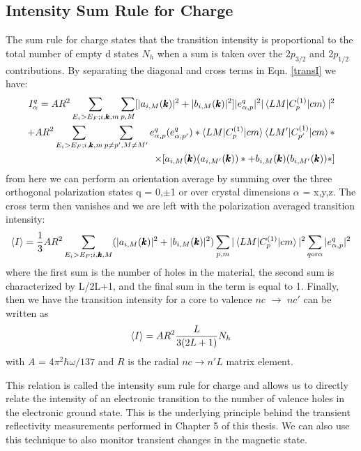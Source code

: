 \subsection{Intensity Sum Rule for Charge}

The sum rule for charge states that the transition intensity is proportional to the total number of empty d states $N_h$ when a sum is taken over the 2$p_{3/2}$ and 2$p_{1/2}$ contributions. By separating the diagonal and cross terms in Eqn. \ref{transI} we have:
\begin{align}
I_{\alpha}^q=AR^2\sum_{E_i>E_F; i ,\pmb{k}, m}\sum_{p,M}[|a_{i,M}(\pmb{k})|^2+|b_{i,M}(\pmb{k})|^2]|e_{\alpha,p}^q|^2|\braket{LM|C_p^{(1)}|cm}|^2 \\
+ AR^2\sum_{E_i>E_F; i,\pmb{k},m}\sum_{p \neq p', M \neq M'}e^q_{\alpha,p}(e^q_{\alpha,p'})*\braket{LM|C_p^{(1)}|cm}\braket{LM'|C_{p'}^{(1)}|cm}* \\
\times [a_{i,M}(\pmb{k})(a_{i,M'}(\pmb{k}))*+b_{i,M}(\pmb{k})(b_{i,M'}(\pmb{k}))*]
\end{align}
from here we can perform an orientation average by summing over the three orthogonal polarization states q = 0,$\pm$1 or over crystal dimensions $\alpha$ = x,y,z. The cross term then vanishes and we are left with the polarization averaged transition intensity:
\begin{eqnarray}
\braket{I}=\frac{1}{3}AR^2\sum_{E_i>E_F; i,\pmb{k},M}(|a_{i,M}(\pmb{k})|^2+|b_{i,M}(\pmb{k})|^2)\sum_{p,m}|\braket{LM|C_p^{(1)}|cm}|^2\sum_{q \text{or} \alpha}|e_{\alpha,p}^q|^2
\end{eqnarray}
where the first sum is the number of holes in the material, the second sum is characterized by L/2L+1, and the final sum in the term is equal to 1. Finally, then we have the transition intensity for a core to valence $nc$ $\rightarrow$ $nc'$ can be written as
\begin{equation}
\braket{I} = AR^2\frac{L}{3(2L+1)}N_h
\end{equation}
with $A$ = 4$\pi^2\hbar\omega/137$ and $R$ is the radial $nc\rightarrow n'L$ matrix element.

This relation is called the intensity sum rule for charge and allows us to directly relate the intensity of an electronic transition to the number of valence holes in the electronic ground state. This is the underlying principle behind the transient reflectivity measurements performed in Chapter 5 of this thesis. We can also use this technique to also monitor transient changes in the magnetic state.

